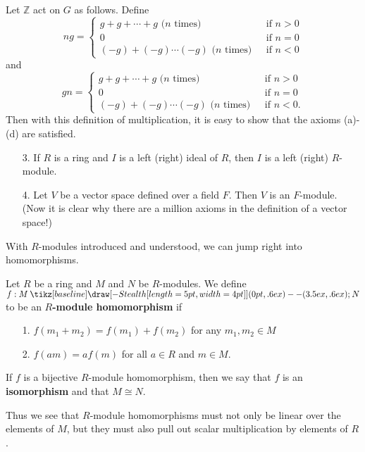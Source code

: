 \documentclass[12pt,letterpaper]{algebra_book}
\renewcommand{\to}{\mathbin{\tikz[baseline] \draw[-{Stealth[length=5pt,width=4pt]}] (0pt,.6ex) -- (3.5ex,.6ex);}}
\newcommand{\ZZ}{\mathbb{Z}}
\theoremstyle{definition}
\begin{document}
\begin{prf}
    Let $\ZZ$ act on $G$ as follows. Define 
    \[
        ng = 
        \begin{cases}
            g + g + \cdots + g \text{ ($n$ times)} & \text{ if } n  > 0\\ 
            0 & \text{ if } n = 0\\
            (-g) + (-g) \cdots (-g) \text{ ($n$ times) } & \text{ if } n < 0
        \end{cases}
    \]
    and 
    \[
        gn = 
        \begin{cases}
            g + g + \cdots + g \text{ ($n$ times)} & \text{ if } n  > 0\\ 
            0 & \text{ if } n = 0\\
            (-g) + (-g) \cdots (-g) \text{ ($n$ times) } & \text{ if } n < 0.
        \end{cases}
    \]
    Then with this definition of multiplication, it is easy to
    show that the axioms (a)-(d) are satisfied.
\end{prf}

\begin{itemize}
    \item[3.] If $R$ is a ring and $I$ is a left (right) ideal of
    $R$, then $I$ is a left (right) $R$-module. 

    \item[4.] Let $V$ be a vector space defined over a field $F$.
    Then $V$ is an $F$-module. (Now it is clear why there are a
    million axioms in the definition of a vector space!)
\end{itemize}

With $R$-modules introduced and understood, we can jump right into
homomorphisms. 
\begin{definition}
    Let $R$ be a ring and $M$ and $N$ be $R$-modules. We define
    $f: M \to N$ to be an \textbf{$R$-module homomorphism} if 
    \begin{itemize}
        \item[1.] $f(m_1 + m_2) = f(m_1) + f(m_2)$ for any $m_1,
        m_2 \in M$ 
        \item[2.] $f(am) = af(m)$ for all $a \in R$ and $m \in M$.
    \end{itemize}
    If $f$ is a bijective $R$-module homomorphism, then we say
    that $f$ is an \textbf{isomorphism} and that $M \cong N$.
\end{definition}
Thus we see that $R$-module homomorphisms must not only be linear
over the elements of $M$, but they must also pull out scalar
multiplication by elements of $R$.
\end{document}
